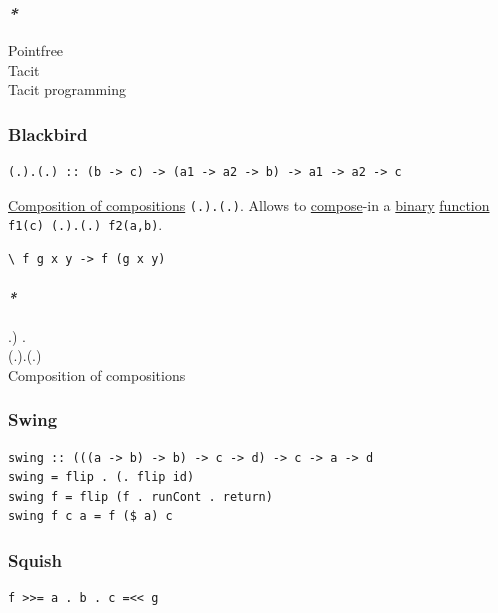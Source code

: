 \documentclass[11pt]{article}
\begin{document}
\subsubsection{\emph{*}}
\label{sec:org6a29116}

\label{orgd12a35a}Pointfree\\
\label{org76a9852}Tacit\\
\label{org7fcfecd}Tacit programming\\

\subsubsection{\label{org8caf2c6}Blackbird}
\label{sec:orgc14852f}
\begin{verbatim}
(.).(.) :: (b -> c) -> (a1 -> a2 -> b) -> a1 -> a2 -> c
\end{verbatim}

\hyperref[orgd008d2d]{Composition of compositions} \texttt{(.).(.)}. Allows to \hyperref[org5956f19]{compose}-in a \hyperref[org57bd48f]{binary} \hyperref[orge15bc14]{function} \texttt{f1(c) (.).(.) f2(a,b)}.\\
\begin{verbatim}
\ f g x y -> f (g x y)
\end{verbatim}

\paragraph{\emph{*}}
\label{sec:orgdfd7acf}

\label{org5c4ca0d}.) .\\
\label{org731fbc0}(.).(.)\\
\label{orgd008d2d}Composition of compositions\\

\subsubsection{\label{orge943ccc}Swing}
\label{sec:orge152e67}
\begin{verbatim}
swing :: (((a -> b) -> b) -> c -> d) -> c -> a -> d
swing = flip . (. flip id)
swing f = flip (f . runCont . return)
swing f c a = f ($ a) c
\end{verbatim}

\subsubsection{\label{org947729b}Squish}
\label{sec:org8721eb6}
\begin{verbatim}
f >>= a . b . c =<< g
\end{verbatim}
\end{document}
